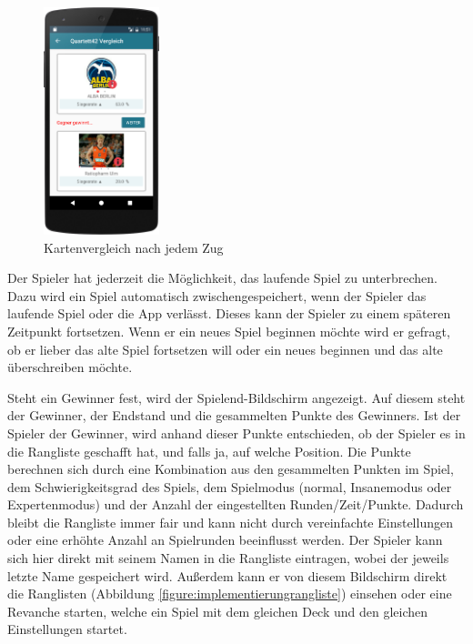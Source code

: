 \begin{figure}[htp]
	\centering
  	\includegraphics[width=0.3\textwidth]{img/screenshots/device_comparison.png}
	\caption{Kartenvergleich nach jedem Zug}
	\label{figure:implementierungspiel2}
\end{figure}

Der Spieler hat jederzeit die Möglichkeit, das laufende Spiel zu unterbrechen. Dazu wird ein Spiel automatisch zwischengespeichert, wenn der Spieler das laufende Spiel oder die App verlässt. Dieses kann der Spieler zu einem späteren Zeitpunkt fortsetzen. Wenn er ein neues Spiel beginnen möchte wird er gefragt, ob er lieber das alte Spiel fortsetzen will oder ein neues beginnen und das alte überschreiben möchte.

Steht ein Gewinner fest, wird der Spielend-Bildschirm angezeigt. Auf diesem steht der Gewinner, der Endstand und die gesammelten Punkte des Gewinners. Ist der Spieler der Gewinner, wird anhand dieser Punkte entschieden, ob der Spieler es in die Rangliste geschafft hat, und falls ja, auf welche Position. Die Punkte berechnen sich durch eine Kombination aus den gesammelten Punkten im Spiel, dem Schwierigkeitsgrad des Spiels, dem Spielmodus (normal, Insanemodus oder Expertenmodus) und der Anzahl der eingestellten Runden/Zeit/Punkte. Dadurch bleibt die Rangliste immer fair und kann nicht durch vereinfachte Einstellungen oder eine erhöhte Anzahl an Spielrunden beeinflusst werden. Der Spieler kann sich hier direkt mit seinem Namen in die Rangliste eintragen, wobei der jeweils letzte Name gespeichert wird. Außerdem kann er von diesem Bildschirm direkt die Ranglisten (Abbildung \ref{figure:implementierungrangliste}) einsehen oder eine Revanche starten, welche ein Spiel mit dem gleichen Deck und den gleichen Einstellungen startet.

